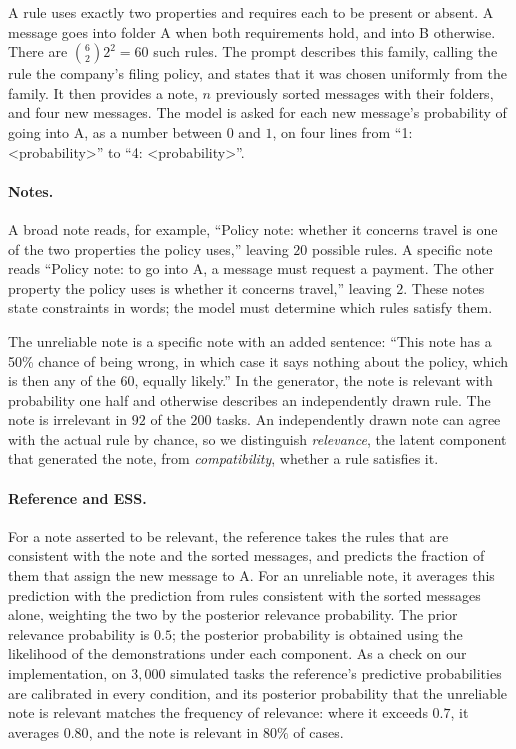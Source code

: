 A rule uses exactly two properties and requires each to be present or absent. A message goes into folder A when both requirements hold, and into B otherwise. There are $\binom{6}{2}2^2=60$ such rules. The prompt describes this family, calling the rule the company's filing policy, and states that it was chosen uniformly from the family. It then provides a note, $n$ previously sorted messages with their folders, and four new messages. The model is asked for each new message's probability of going into A, as a number between $0$ and $1$, on four lines from ``1: \textless probability\textgreater'' to ``4: \textless probability\textgreater''.

\paragraph{Notes.}
A broad note reads, for example, ``Policy note: whether it concerns travel is one of the two properties the policy uses,'' leaving $20$ possible rules. A specific note reads ``Policy note: to go into A, a message must request a payment. The other property the policy uses is whether it concerns travel,'' leaving $2$. These notes state constraints in words; the model must determine which rules satisfy them.

The unreliable note is a specific note with an added sentence: ``This note has a 50\% chance of being wrong, in which case it says nothing about the policy, which is then any of the 60, equally likely.'' In the generator, the note is relevant with probability one half and otherwise describes an independently drawn rule. The note is irrelevant in $92$ of the $200$ tasks. An independently drawn note can agree with the actual rule by chance, so we distinguish \emph{relevance}, the latent component that generated the note, from \emph{compatibility}, whether a rule satisfies it.

\paragraph{Reference and ESS.}
For a note asserted to be relevant, the reference takes the rules that are consistent with the note and the sorted messages, and predicts the fraction of them that assign the new message to A. For an unreliable note, it averages this prediction with the prediction from rules consistent with the sorted messages alone, weighting the two by the posterior relevance probability. The prior relevance probability is $0.5$; the posterior probability is obtained using the likelihood of the demonstrations under each component. As a check on our implementation, on $3{,}000$ simulated tasks the reference's predictive probabilities are calibrated in every condition, and its posterior probability that the unreliable note is relevant matches the frequency of relevance: where it exceeds $0.7$, it averages $0.80$, and the note is relevant in $80\%$ of cases.

